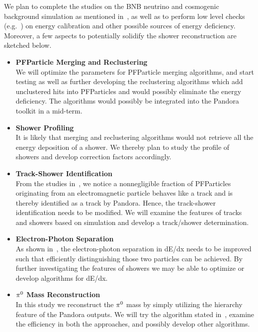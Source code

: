 We plan to complete the studies on the BNB neutrino and cosmogenic
background simulation as mentioned in~,
as well as to perform low level checks (e.g.~\cite{DocDB5814}) 
on energy calibration
and other possible sources of energy deficiency.
Moreover, a few aspects to potentially solidify the shower reconstruction
are sketched below.
\begin{itemize}
\item {\bf PFParticle Merging and Reclustering} \\
We will optimize the parameters for PFParticle merging algorithms,
and start testing as well as further developing the reclustering algorithms
which add unclustered hits into PFParticles and would possibly
eliminate the energy deficiency.
The algorithms would possibly be integrated into the Pandora
toolkit in a mid-term.

\item {\bf Shower Profiling} \\
It is likely that merging and reclustering algorithms would not
retrieve all the energy deposition of a shower.
We thereby plan to study the profile of showers and develop
correction factors accordingly.

\item {\bf Track-Shower Identification} \\
From the studies in~, we notice
a nonnegligible fraction of PFParticles originating from an 
electromagnetic particle behaves like a track and is thereby
identified as a track by Pandora.
Hence, the track-shower identification needs to be modified.
We will examine the features of tracks and showers based on
simulation and develop a track/shower determination.

\item {\bf Electron-Photon Separation} \\
As shown in~, 
the electron-photon separation in
dE/dx needs to be improved such that efficiently distinguishing 
those two particles can be achieved.
By further investigating the features of showers we may be able 
to optimize or develop algorithms for dE/dx.

\item {\bf ${\pi}^0$ Mass Reconstruction} \\
In this study we reconstruct the ${\pi}^0$ mass by
simply utilizing the hierarchy feature of the 
Pandora outputs.
We will try the algorithm stated in~\cite{DocDB5520}, examine
the efficiency in both the approaches, and possibly develop
other algorithms.
\end{itemize}

